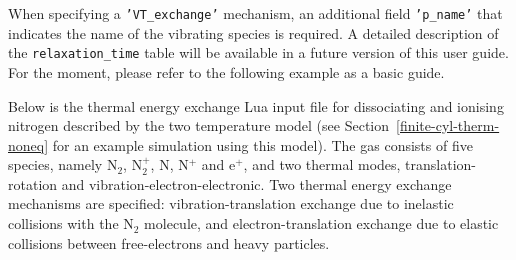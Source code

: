 \par

When specifying a \texttt{'VT\_exchange'} mechanism, an additional field \texttt{'p\_name'}
that indicates the name of the vibrating species is required.
A detailed description of the \texttt{relaxation\_time} table will be available in a 
future version of this user guide.
For the moment, please refer to the following example as a basic guide.

\par

Below is the thermal energy exchange Lua input file for dissociating and ionising nitrogen
described by the two temperature model (see Section~\ref{finite-cyl-therm-noneq} for
an example simulation using this model).
The gas consists of five species, namely N$_2$, N$_2^+$, N, N$^+$ and e$^+$, and two thermal
modes, translation-rotation and vibration-electron-electronic.
Two thermal energy exchange mechanisms are specified: vibration-translation exchange due to
inelastic collisions with the N$_2$ molecule, and electron-translation exchange due to elastic 
collisions between free-electrons and heavy particles.\\
\topbar\\

\bottombar\\